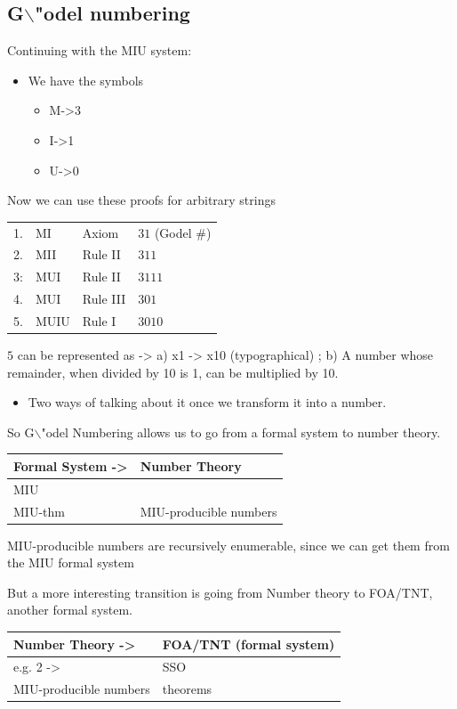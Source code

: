 \documentclass[11pt]{article}
\begin{document}
\subsection{G$\backslash$"odel numbering}
\label{sec:org47d7fe6}
Continuing with the MIU system:
\begin{itemize}
\item We have the symbols
\begin{itemize}
\item M->3
\item I->1
\item U->0
\end{itemize}
\end{itemize}
Now we can use these proofs for arbitrary strings
\begin{center}
\begin{tabular}{rlll}
1. & MI & Axiom & \(31\) (Godel \#)\\
2. & MII & Rule II & \(311\)\\
3: & MUI & Rule II & \(3111\)\\
4. & MUI & Rule III & \(301\)\\
5. & MUIU & Rule I & \(3010\)\\
\end{tabular}
\end{center}
\(5\) can be represented as -> a) x1 -> x10 (typographical) ; b) A number whose remainder, when divided by 10 is 1, can be multiplied by 10.
\begin{itemize}
\item Two ways of talking about it once we transform it into a number.
\end{itemize}

So G$\backslash$"odel Numbering allows us to go from a formal system to number theory. 
\begin{center}
\begin{tabular}{ll}
Formal System -> & Number Theory\\
\hline
MIU & \\
MIU-thm & MIU-producible numbers\\
\end{tabular}
\end{center}
MIU-producible numbers are recursively enumerable, since we can get them from the MIU formal system   

But a more interesting transition is going from Number theory to FOA/TNT, another formal system.
\begin{center}
\begin{tabular}{ll}
Number Theory -> & FOA/TNT (formal system)\\
\hline
e.g. 2 -> & SSO\\
MIU-producible numbers & theorems\\
\end{tabular}
\end{center}
\end{document}
